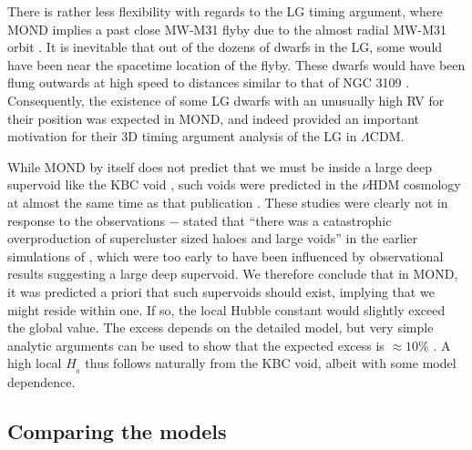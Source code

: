 \documentclass[fleqn,usenatbib,useAMS]{mnras} %
\begin{document}


There is rather less flexibility with regards to the LG timing argument, where MOND implies a past close MW-M31 flyby \citep{Zhao_2013, Banik_Ryan_2018} due to the almost radial MW-M31 orbit \citep{Van_der_Marel_2012, Van_der_Marel_2019, Salomon_2021}. It is inevitable that out of the dozens of dwarfs in the LG, some would have been near the spacetime location of the flyby. These dwarfs would have been flung outwards at high speed to distances similar to that of NGC 3109 \citep{Banik_2018_anisotropy}. Consequently, the existence of some LG dwarfs with an unusually high RV for their position was expected in MOND, and indeed provided an important motivation for their 3D timing argument analysis of the LG in $\Lambda$CDM.

While MOND by itself does not predict that we must be inside a large deep supervoid like the KBC void \citep{Keenan_2013}, such voids were predicted in the $\nu$HDM cosmology at almost the same time as that publication \citep{Angus_2013, Katz_2013}. These studies were clearly not in response to the observations $-$ \citet{Angus_2013} stated that ``there was a catastrophic overproduction of supercluster sized haloes and large voids'' in the earlier simulations of \citet{Angus_Diaferio_2011}, which were too early to have been influenced by observational results suggesting a large deep supervoid. We therefore conclude that in MOND, it was predicted a priori that such supervoids should exist, implying that we might reside within one. If so, the local Hubble constant would slightly exceed the global value. The excess depends on the detailed model, but very simple analytic arguments can be used to show that the expected excess is $\approx 10\%$ \citep[section~1.1 of][]{Haslbauer_2020}. A high local $H_{_0}$ thus follows naturally from the KBC void, albeit with some model dependence.



\subsection{Comparing the models}
\label{LCDM_MOND_comparison}
\end{document}
